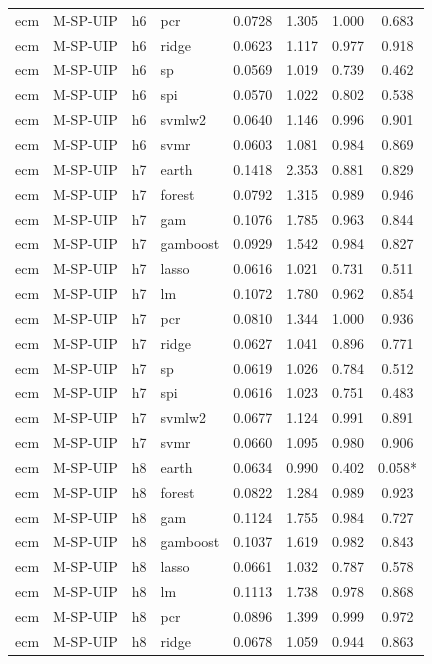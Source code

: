 \begin{ThreePartTable}
\begin{longtable}[t]{llclcccc}
ecm & M-SP-UIP & h6 & pcr & 0.0728 & 1.305 & 1.000 & 0.683\\
ecm & M-SP-UIP & h6 & ridge & 0.0623 & 1.117 & 0.977 & 0.918\\
ecm & M-SP-UIP & h6 & sp & 0.0569 & 1.019 & 0.739 & 0.462\\
ecm & M-SP-UIP & h6 & spi & 0.0570 & 1.022 & 0.802 & 0.538\\
ecm & M-SP-UIP & h6 & svmlw2 & 0.0640 & 1.146 & 0.996 & 0.901\\
ecm & M-SP-UIP & h6 & svmr & 0.0603 & 1.081 & 0.984 & 0.869\\
\addlinespace
ecm & M-SP-UIP & h7 & earth & 0.1418 & 2.353 & 0.881 & 0.829\\
ecm & M-SP-UIP & h7 & forest & 0.0792 & 1.315 & 0.989 & 0.946\\
ecm & M-SP-UIP & h7 & gam & 0.1076 & 1.785 & 0.963 & 0.844\\
ecm & M-SP-UIP & h7 & gamboost & 0.0929 & 1.542 & 0.984 & 0.827\\
ecm & M-SP-UIP & h7 & lasso & 0.0616 & 1.021 & 0.731 & 0.511\\
ecm & M-SP-UIP & h7 & lm & 0.1072 & 1.780 & 0.962 & 0.854\\
ecm & M-SP-UIP & h7 & pcr & 0.0810 & 1.344 & 1.000 & 0.936\\
ecm & M-SP-UIP & h7 & ridge & 0.0627 & 1.041 & 0.896 & 0.771\\
ecm & M-SP-UIP & h7 & sp & 0.0619 & 1.026 & 0.784 & 0.512\\
ecm & M-SP-UIP & h7 & spi & 0.0616 & 1.023 & 0.751 & 0.483\\
ecm & M-SP-UIP & h7 & svmlw2 & 0.0677 & 1.124 & 0.991 & 0.891\\
ecm & M-SP-UIP & h7 & svmr & 0.0660 & 1.095 & 0.980 & 0.906\\
\addlinespace
ecm & M-SP-UIP & h8 & earth & 0.0634 & 0.990 & 0.402 & 0.058*\\
ecm & M-SP-UIP & h8 & forest & 0.0822 & 1.284 & 0.989 & 0.923\\
ecm & M-SP-UIP & h8 & gam & 0.1124 & 1.755 & 0.984 & 0.727\\
ecm & M-SP-UIP & h8 & gamboost & 0.1037 & 1.619 & 0.982 & 0.843\\
ecm & M-SP-UIP & h8 & lasso & 0.0661 & 1.032 & 0.787 & 0.578\\
ecm & M-SP-UIP & h8 & lm & 0.1113 & 1.738 & 0.978 & 0.868\\
ecm & M-SP-UIP & h8 & pcr & 0.0896 & 1.399 & 0.999 & 0.972\\
ecm & M-SP-UIP & h8 & ridge & 0.0678 & 1.059 & 0.944 & 0.863\\

\end{longtable}
\end{ThreePartTable}
